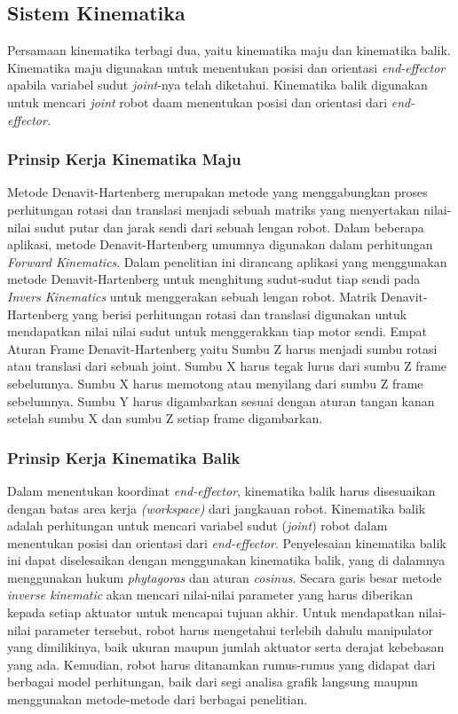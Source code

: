 \subsection{Sistem Kinematika}
Persamaan kinematika terbagi dua, yaitu kinematika maju dan kinematika balik. Kinematika maju digunakan untuk menentukan posisi dan orientasi \textit{end-effector} apabila variabel sudut \textit{joint}-nya telah diketahui. Kinematika balik digunakan untuk mencari \textit{joint} robot daam menentukan posisi dan orientasi dari \textit{end-effector.}
\subsubsection{Prinsip Kerja Kinematika Maju}
Metode Denavit-Hartenberg merupakan metode yang menggabungkan proses perhitungan rotasi dan translasi menjadi sebuah matriks yang menyertakan nilai-nilai sudut putar dan jarak sendi dari sebuah lengan robot. Dalam beberapa aplikasi, metode Denavit-Hartenberg umumnya digunakan dalam perhitungan \textit{Forward Kinematics}. Dalam penelitian ini dirancang aplikasi yang menggunakan metode Denavit-Hartenberg untuk menghitung sudut-sudut tiap sendi pada \textit{Invers Kinematics} untuk menggerakan sebuah lengan robot. Matrik Denavit-Hartenberg yang berisi perhitungan rotasi dan translasi digunakan untuk mendapatkan nilai nilai sudut untuk menggerakkan tiap motor sendi. Empat Aturan Frame Denavit-Hartenberg yaitu Sumbu Z harus menjadi sumbu rotasi atau translasi dari sebuah joint. Sumbu X harus tegak lurus dari sumbu Z frame sebelumnya. Sumbu X harus memotong atau menyilang dari sumbu Z frame sebelumnya. Sumbu Y harus digambarkan sesuai dengan aturan tangan kanan setelah sumbu X   dan sumbu Z setiap frame digambarkan.
\subsubsection{Prinsip Kerja Kinematika Balik}
Dalam menentukan koordinat \textit{end-effector}, kinematika balik harus disesuaikan dengan batas area kerja \textit{(workspace)} dari jangkauan robot. Kinematika balik adalah perhitungan untuk mencari variabel sudut (\textit{joint}) robot dalam menentukan posisi dan orientasi dari \textit{end-effector}. Penyelesaian kinematika balik ini dapat diselesaikan dengan menggunakan kinematika balik, yang di dalamnya menggunakan hukum \textit{phytagoras} dan aturan \textit{cosinus}. 
Secara garis besar metode \textit{inverse kinematic} akan mencari nilai-nilai parameter yang harus diberikan kepada setiap aktuator untuk mencapai tujuan akhir. Untuk mendapatkan nilai-nilai parameter tersebut, robot harus mengetahui terlebih dahulu manipulator yang dimilikinya, baik ukuran maupun jumlah aktuator serta derajat kebebasan yang ada. Kemudian, robot harus ditanamkan rumus-rumus yang didapat dari berbagai model perhitungan, baik dari segi analisa grafik langsung maupun menggunakan metode-metode dari berbagai penelitian. 

